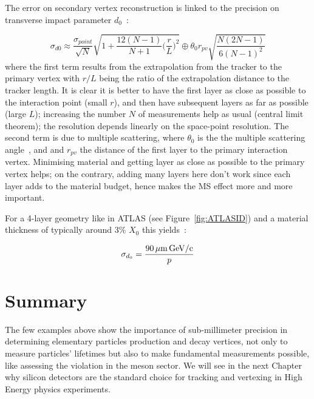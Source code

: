 The error on secondary vertex reconstruction is linked to the precision on 
transverse impact parameter $d_0$~\cite{Garcia-Sciveres:2017ymt}:

\begin{equation}
\sigma_{d0}\approx\dfrac{\sigma_{point}}{\sqrt{N}}\sqrt{1+\dfrac{12(N-1)}{N+1}\Big(\dfrac{r}{L}\Big)^2}\oplus\theta_0 r_{pv}\sqrt{\dfrac{N(2N-1)}{6(N-1)^2}}
\label{eq:d0res}
\end{equation} 
where the first term results from the extrapolation from the tracker to the primary vertex with $r/L$
being the ratio of the extrapolation distance to the tracker length. It is clear it is better to have 
the first layer as close as possible to the interaction point (small $r$), and then have 
subsequent layers as far as possible (large $L$); increasing the number $N$ of measurements 
help as usual (central limit theorem); the resolution depends 
linearly on the space-point resolution. The second term is due to multiple scattering, where 
$\theta_0$ is the the multiple scattering angle~\cite{Olive:2016xmw}, and and $r_{pv}$ the distance 
of the first  layer to the primary interaction vertex. Minimising material and getting layer as 
close as possible to the primary vertex helps; on the contrary, adding many layers here don't work 
since each layer adds to the material budget, hence makes the MS effect more and more important.

For a 4-layer geometry like in ATLAS (see Figure~\ref{fig:ATLASID}) and a material thickness of 
typically around  3\% $X_0$ this yields~\cite{Garcia-Sciveres:2017ymt}:

\begin{equation}
\sigma_{d_{0}}=\dfrac{90\,\mu {\rm m\,GeV/c}}{p}
\end{equation}

\section{Summary}
The few examples above show the importance of sub-millimeter precision in determining elementary 
particles production  and decay vertices, not only to measure  particles' lifetimes but also 
to make fundamental measurements possible, like assessing the  \CP violation in the \B meson 
sector. We will see in the next Chapter why silicon detectors are the standard choice for tracking and 
vertexing in High Energy physics experiments.
